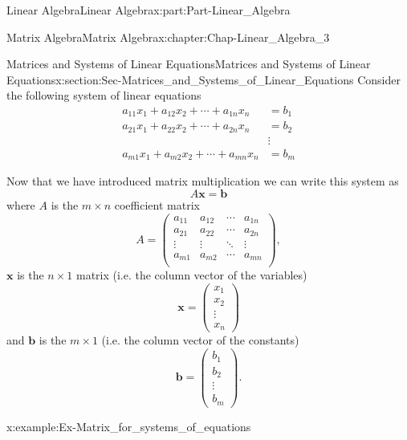 \documentclass[oneside,10pt,]{book}
\numberwithin{equation}{section}
\newcommand{\amp}{&}
\begin{document}
\begin{partptx}{Linear Algebra}{}{Linear Algebra}{}{}{x:part:Part-Linear_Algebra}
\begin{chapterptx}{Matrix Algebra}{}{Matrix Algebra}{}{}{x:chapter:Chap-Linear_Algebra_3}
\typeout{************************************************}
%
\begin{sectionptx}{Matrices and Systems of Linear Equations}{}{Matrices and Systems of Linear Equations}{}{}{x:section:Sec-Matrices_and_Systems_of_Linear_Equations}
Consider the following system of linear equations%
\begin{align*}
a_{11}x_1 + a_{12}x_2 + \cdots + a_{1n}x_n  \amp= b_1\\
a_{21}x_1 + a_{22}x_2 + \cdots + a_{2n}x_n  \amp= b_2\\
\quad\amp \vdots \quad\\
a_{m1}x_1 + a_{m2}x_2 + \cdots + a_{mn}x_n  \amp= b_m
\end{align*}
%
\par
Now that we have introduced matrix multiplication we can write this system as%
\begin{equation*}
A \mathbf{x} = \mathbf{b}
\end{equation*}
where \(A\) is the \(m \times n\) coefficient matrix%
\begin{equation*}
A = \begin{pmatrix}
a_{11} \amp a_{12} \amp  \cdots \amp a_{1n}\\
a_{21} \amp a_{22} \amp \cdots \amp a_{2n}\\
\vdots \amp \vdots \amp \ddots \amp \vdots\\
a_{m1} \amp a_{m2} \amp \cdots \amp a_{mn}\\
\end{pmatrix},
\end{equation*}
\(\mathbf{x}\) is the \(n \times 1\) matrix (i.e. the column vector of the variables)%
\begin{equation*}
\mathbf{x}=\begin{pmatrix}x_1 \\ x_2 \\\vdots \\x_n\end{pmatrix}
\end{equation*}
and \(\mathbf{b}\) is the \(m \times 1\) (i.e. the column vector of the constants)%
\begin{equation*}
\mathbf{b} = \begin{pmatrix}b_1 \\ b_2 \\ \vdots \\ b_m\end{pmatrix}.
\end{equation*}
%
\begin{example}{}{x:example:Ex-Matrix_for_systems_of_equations}%

\end{example}
\end{sectionptx}
\end{chapterptx}
\end{partptx}
\end{document}
